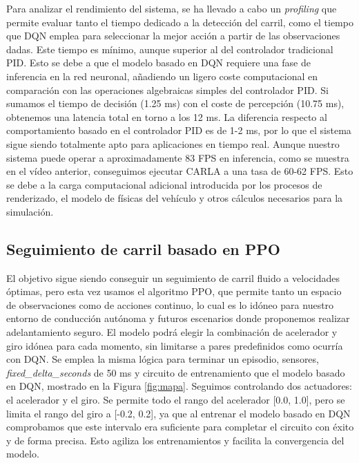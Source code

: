 Para analizar el rendimiento del sistema, se ha llevado a cabo un \textit{profiling} que permite evaluar tanto el tiempo dedicado a la detección del carril, como el tiempo que \ac{DQN} emplea para seleccionar la mejor acción a partir de las observaciones dadas. Este tiempo es mínimo, aunque superior al del controlador tradicional \ac{PID}. Esto se debe a que el modelo basado en \ac{DQN} requiere una fase de inferencia en la red neuronal, añadiendo un ligero coste computacional en comparación con las operaciones algebraicas simples del controlador \ac{PID}. Si sumamos el tiempo de decisión (1.25 ms) con el coste de percepción (10.75 ms), obtenemos una latencia total en torno a los 12 ms. La diferencia respecto al comportamiento basado en el controlador \ac{PID} es de 1-2 ms, por lo que el sistema sigue siendo totalmente apto para aplicaciones en tiempo real. Aunque nuestro sistema puede operar a aproximadamente 83 \ac{FPS} en inferencia, como se muestra en el vídeo anterior\footnotemark[3], conseguimos ejecutar CARLA a una tasa de 60-62 \ac{FPS}. Esto se debe a la carga computacional adicional introducida por los procesos de renderizado, el modelo de físicas del vehículo y otros cálculos necesarios para la simulación.

\subsection{Seguimiento de carril basado en PPO}

El objetivo sigue siendo conseguir un seguimiento de carril fluido a velocidades óptimas, pero esta vez usamos el algoritmo \ac{PPO}, que permite tanto un espacio de observaciones como de acciones continuo, lo cual es lo idóneo para nuestro entorno de conducción autónoma y futuros escenarios donde proponemos realizar adelantamiento seguro. El modelo podrá elegir la combinación de acelerador y giro idónea para cada momento, sin limitarse a pares predefinidos como ocurría con \ac{DQN}. Se emplea la misma lógica para terminar un episodio, sensores, \textit{fixed\_delta\_seconds} de 50 ms y circuito de entrenamiento que el modelo basado en \ac{DQN}, mostrado en la Figura \ref{fig:mapa}. Seguimos controlando dos actuadores: el acelerador y el giro. Se permite todo el rango del acelerador [0.0, 1.0], pero se limita el rango del giro a [-0.2, 0.2], ya que al entrenar el modelo basado en \ac{DQN} comprobamos que este intervalo era suficiente para completar el circuito con éxito y de forma precisa. Esto agiliza los entrenamientos y facilita la convergencia del modelo.

